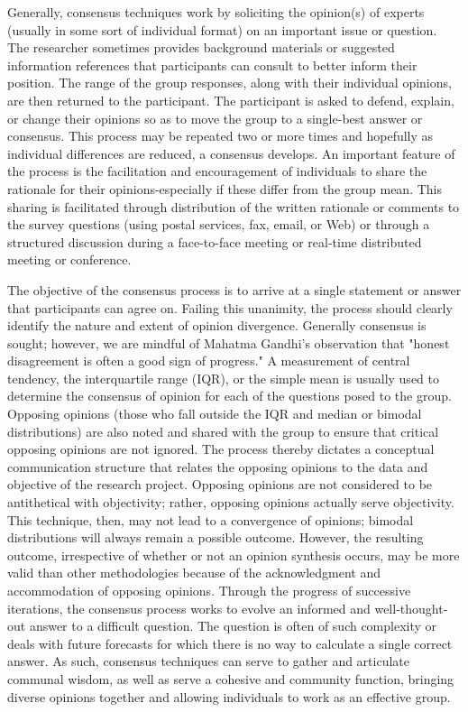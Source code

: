 \documentclass[a4]{article}
\begin{document}
Generally, consensus techniques work by soliciting the opinion(s) of experts (usually in some sort of individual format) on an important issue or question. The researcher sometimes provides background materials or suggested information references that participants can consult to better inform their position. The range of the group responses, along with their individual opinions, are then returned to the participant. The participant is asked to defend, explain, or change their opinions so as to move the group to a single-best answer or consensus. This process may be repeated two or more times and hopefully as individual differences are reduced, a consensus develops. An important feature of the process is the facilitation and encouragement of individuals to share the rationale for their opinions-especially if these differ from the group mean. This sharing is facilitated through distribution of the written rationale or comments to the survey questions (using postal services, fax, email, or Web) or through a structured discussion during a face-to-face meeting or real-time distributed meeting or conference.

The objective of the consensus process is to arrive at a single statement or answer that participants can agree on. Failing this unanimity, the process should clearly identify the nature and extent of opinion divergence. Generally consensus is sought; however, we are mindful of Mahatma Gandhi's observation that "honest disagreement is often a good sign of progress." A measurement of central tendency, the interquartile range (IQR), or the simple mean is usually used to determine the consensus of opinion for each of the questions posed to the group. Opposing opinions (those who fall outside
the IQR and median or bimodal distributions) are also noted and shared with the group to ensure that critical opposing opinions are not ignored. The process thereby dictates a conceptual communication structure that relates the opposing opinions to the data and objective of the research project. Opposing opinions are not considered to be antithetical with objectivity; rather, opposing opinions actually serve objectivity. This technique, then, may not lead to a convergence of opinions; bimodal distributions will always remain a possible outcome. However, the resulting outcome, irrespective of whether or not an opinion synthesis occurs, may be more valid than other methodologies because of the acknowledgment and accommodation of opposing opinions. Through the progress of successive iterations, the consensus process works to evolve an informed and well-thought-out answer to a difficult question. The question is often of such complexity or deals with future forecasts for which there is no way to calculate a single correct answer. As such, consensus techniques can serve to gather and articulate communal wisdom, as well as serve a cohesive and community function, bringing diverse opinions together and allowing individuals to work as an effective group.
\end{document}
